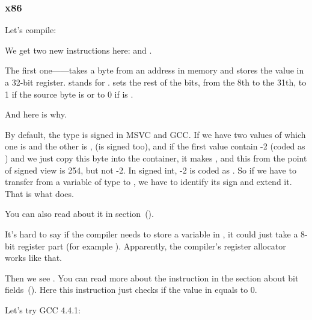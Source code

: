\subsubsection{x86}


Let's compile:




We get two new instructions here: \MOVSX and \TEST.

\label{MOVSX}

The first one---\MOVSX---takes a byte from an address in memory and stores the value in a 32-bit register. 
\MOVSX stands for . 
\MOVSX sets the rest of the bits, from the 8th to the 31th, 
to 1 if the source byte is  or to 0 if is .

And here is why.

By default, the \Tchar type is signed in MSVC and GCC. If we have two values of which one is \Tchar 
and the other is \Tint, (\Tint is signed too), and if the first value contain -2 (coded as ) 
and we just copy this byte into the \Tint container, it makes , and this 
from the point of signed \Tint view is 254, but not -2. In signed int, -2 is coded as . 
So if we have to transfer  from a variable of \Tchar type to \Tint, 
we have to identify its sign and extend it. That is what \MOVSX does.

You can also read about it in \q{\IT{\SignedNumbersSectionName}} section~().

It's hard to say if the compiler needs to store a \Tchar variable in \EDX, it could just take a 8-bit register part 
(for example \DL). Apparently, the compiler's \gls{register allocator} works like that.


Then we see . 
You can read more about the \TEST instruction in the section about bit fields~().
Here this instruction just checks if the value in \EDX equals to 0.


Let's try GCC 4.4.1:



